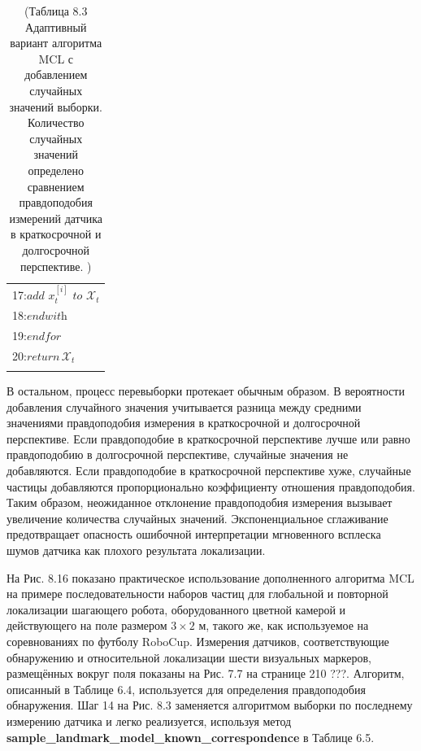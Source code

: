 \documentclass[10pt,a4paper]{article}
\begin{document}
\begin{table}[H]
\begin{center}
\begin{tabular}{|l|}
17:\hspace{14mm}$\textit{add}\,\,x_t^{[i]}\,\,\textit{to}\,\,\mathcal{X}_t$\\
18:\hspace{9mm}$\textit{endwith}$\\
19:\hspace{4mm}$\textit{endfor}$\\
20:\hspace{4mm}$\textit{return}\,\mathcal{X}_t$\\
{}\\
\hline
\end{tabular}
\caption{(Таблица  8.3  Адаптивный вариант алгоритма MCL с добавлением случайных значений выборки. Количество случайных значений определено сравнением правдоподобия измерений датчика в краткосрочной и долгосрочной перспективе. )}
\end{center}
\end{table}

В остальном, процесс перевыборки протекает обычным образом. В вероятности добавления случайного значения учитывается разница между средними значениями правдоподобия измерения в краткосрочной и долгосрочной перспективе. Если правдоподобие в краткосрочной перспективе лучше или равно правдоподобию в долгосрочной перспективе, случайные значения не добавляются. Если правдоподобие в краткосрочной перспективе хуже, случайные частицы добавляются пропорционально коэффициенту отношения правдоподобия. Таким образом, неожиданное отклонение правдоподобия измерения вызывает увеличение количества случайных значений. Экспоненциальное сглаживание предотвращает опасность ошибочной интерпретации мгновенного всплеска шумов датчика как плохого результата локализации. 

На Рис. 8.16 показано практическое использование дополненного алгоритма MCL на примере последовательности наборов частиц для глобальной и повторной локализации шагающего робота, оборудованного цветной камерой и действующего на поле размером $3\times2$ м, такого же, как используемое на соревнованиях по футболу RoboCup. Измерения датчиков, соответствующие обнаружению и относительной локализации шести визуальных маркеров, размещённых вокруг поля показаны на Рис. 7.7 на странице 210 ???. Алгоритм, описанный в Таблице 6.4, используется для определения правдоподобия обнаружения. Шаг 14 на Рис. 8.3 заменяется алгоритмом выборки по последнему измерению датчика и легко реализуется, используя  метод \textbf{sample\_landmark\_model\_known\_correspondence} в Таблице 6.5.
\end{document}
